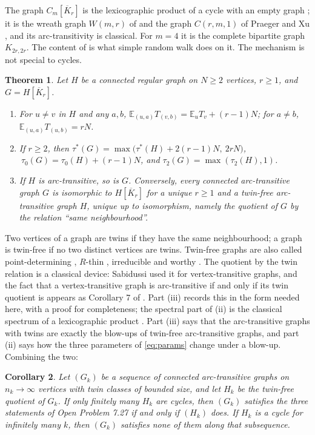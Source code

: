 \documentclass[11pt]{amsart}
\newtheorem{theorem}{Theorem}[section]
\newtheorem{corollary}[theorem]{Corollary}
\theoremstyle{definition}
\newcommand{\E}{\mathbb{E}}
\newcommand{\Kbar}{\overline{K}}
\begin{document}
The graph $C_m[\Kbar_r]$ is the lexicographic product of a cycle with an empty graph \cite{Sabidussi,HIK}; it is the wreath graph $W(m,r)$ of \cite{PW} and the graph $C(r,m,1)$ of Praeger and Xu \cite{PX}, and its arc-transitivity is classical. For $m=4$ it is the complete bipartite graph $K_{2r,2r}$. The content of  is what simple random walk does on it. The mechanism is not special to cycles.

\begin{theorem}\label{thm:blowup}
Let $H$ be a connected regular graph on $N\ge2$ vertices, $r\ge1$, and $G=H[\Kbar_r]$.
\begin{enumerate}
\item[(i)] For $u\ne v$ in $H$ and any $a,b$, $\E_{(u,a)}T_{(v,b)}=\E_uT_v+(r-1)N$; for $a\ne b$, $\E_{(u,a)}T_{(u,b)}=rN$.
\item[(ii)] If $r\ge2$, then $\tau^*(G)=\max\big(\tau^*(H)+2(r-1)N,\ 2rN\big)$, $\ \tau_0(G)=\tau_0(H)+(r-1)N$, and $\tau_2(G)=\max(\tau_2(H),1)$.
\item[(iii)] If $H$ is arc-transitive, so is $G$. Conversely, every connected arc-transitive graph $G$ is isomorphic to $H[\Kbar_r]$ for a unique $r\ge1$ and a twin-free arc-transitive graph $H$, unique up to isomorphism, namely the quotient of $G$ by the relation ``same neighbourhood''.
\end{enumerate}
\end{theorem}

Two vertices of a graph are twins if they have the same neighbourhood; a graph is twin-free if no two distinct vertices are twins. Twin-free graphs are also called point-determining \cite{Sumner}, $R$-thin \cite{HIK}, irreducible \cite{Sabidussi64} and worthy \cite{PW}. The quotient by the twin relation is a classical device: Sabidussi \cite{Sabidussi64} used it for vertex-transitive graphs, and the fact that a vertex-transitive graph is arc-transitive if and only if its twin quotient is appears as Corollary 7 of \cite{CHS}. Part (iii) records this in the form needed here, with a proof for completeness; the spectral part of (ii) is the classical spectrum of a lexicographic product \cite[Section 2.5]{CDS}. Part (iii) says that the arc-transitive graphs with twins are exactly the blow-ups of twin-free arc-transitive graphs, and part (ii) says how the three parameters of \eqref{eq:params} change under a blow-up. Combining the two:

\begin{corollary}\label{cor:reduction}
Let $(G_k)$ be a sequence of connected arc-transitive graphs on $n_k\to\infty$ vertices with twin classes of bounded size, and let $H_k$ be the twin-free quotient of $G_k$. If only finitely many $H_k$ are cycles, then $(G_k)$ satisfies the three statements of Open Problem 7.27 if and only if $(H_k)$ does. If $H_k$ is a cycle for infinitely many $k$, then $(G_k)$ satisfies none of them along that subsequence.
\end{corollary}
\end{document}

